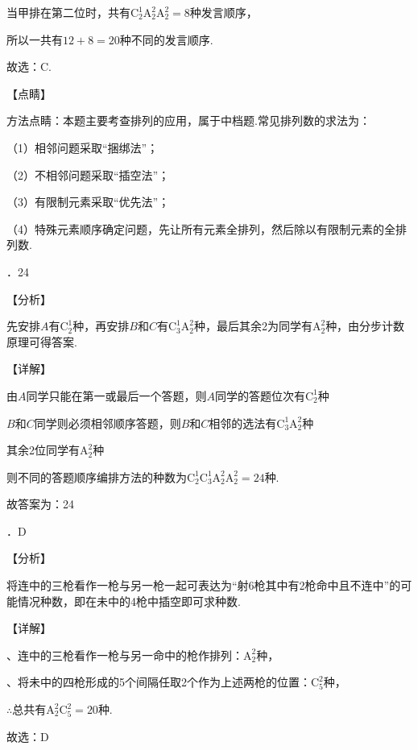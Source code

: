 \noindent 当甲排在第二位时，共有$\mathrm C_{2}^{1} \mathrm A_{2}^{2} \mathrm A_{2}^{2} =8$种发言顺序，

\noindent 所以一共有$12+8=20$种不同的发言顺序.

\noindent 故选：C.

\noindent 【点睛】

\noindent 方法点睛：本题主要考查排列的应用，属于中档题.常见排列数的求法为：

\noindent （1）相邻问题采取``捆绑法''；

\noindent （2）不相邻问题采取``插空法''；

\noindent （3）有限制元素采取``优先法''；

\noindent （4）特殊元素顺序确定问题，先让所有元素全排列，然后除以有限制元素的全排列数.

．24

\noindent 【分析】

\noindent 先安排$A$有$\mathrm C_{2}^{1} $种，再安排$B$和$C$有$\mathrm C_{3}^{1} \mathrm A_{2}^{2} $种，最后其余2为同学有$\mathrm A_{2}^{2} $种，由分步计数原理可得答案.

\noindent 【详解】

\noindent 由$A$同学只能在第一或最后一个答题，则$A$同学的答题位次有$\mathrm C_{2}^{1} $种

\noindent $B$和$C$同学则必须相邻顺序答题，则$B$和$C$相邻的选法有$\mathrm C_{3}^{1} \mathrm A_{2}^{2} $种

\noindent 其余2位同学有$\mathrm A_{2}^{2} $种

\noindent 则不同的答题顺序编排方法的种数为$\mathrm C_{2}^{1} $$\mathrm C_{3}^{1} \mathrm A_{2}^{2} $$\mathrm A_{2}^{2} =24$种.

\noindent 故答案为：24

．D

\noindent 【分析】

\noindent 将连中的三枪看作一枪与另一枪一起可表达为``射6枪其中有2枪命中且不连中''的可能情况种数，即在未中的4枪中插空即可求种数.

\noindent 【详解】

、连中的三枪看作一枪与另一命中的枪作排列：$\mathrm A_{2}^{2} $种，

、将未中的四枪形成的5个间隔任取2个作为上述两枪的位置：$\mathrm C_{5}^{2} $种，

\noindent $\mathrm{\therefore}$总共有$\mathrm A_{2}^{2} \mathrm C_{5}^{2} =20$种.

\noindent 故选：D

